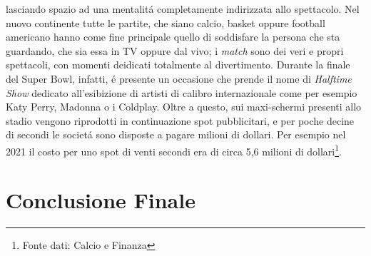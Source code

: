 \documentclass[
    corpo=12pt,
    oneside,
    evenboxes,
    tipotesi=triennale,
    stile=classica,
    oldstyle,
    autoretitolo,
    greek,
]{toptesi}
\begin{document}
\begin{interlinea}{1.5}
lasciando spazio ad una mentalit\'a completamente indirizzata allo spettacolo. Nel nuovo continente tutte le partite, che siano calcio, basket 
oppure football americano hanno come fine principale quello di soddisfare la persona che sta guardando, che sia essa in TV oppure dal vivo;
i \emph{match} sono dei veri e propri spettacoli, con momenti deidicati totalmente al divertimento. Durante la finale del Super Bowl, infatti,
\'e presente un occasione che prende il nome di \emph{Halftime Show} dedicato all'esibizione di artisti di calibro internazionale come per esempio 
Katy Perry, Madonna o i Coldplay. Oltre a questo, sui maxi-schermi presenti allo stadio vengono riprodotti in continuazione spot pubblicitari, 
e per poche decine di secondi le societ\'a sono disposte a pagare milioni di dollari. Per esempio nel 2021 il costo per uno spot di venti secondi 
era di circa 5,6 milioni di dollari\footnote{Fonte dati: Calcio e Finanza}. 
\chapter{Conclusione Finale}
\end{interlinea}
\end{document}

